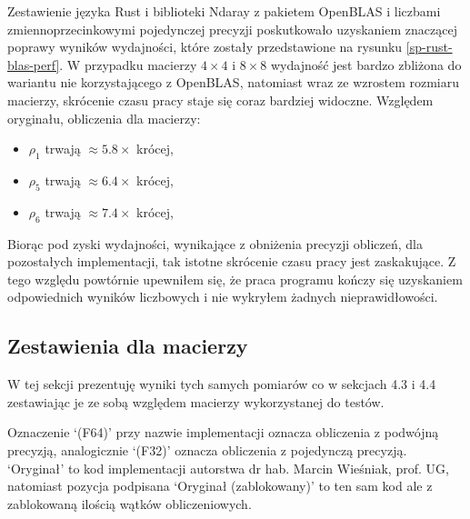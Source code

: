 \documentclass[11pt, a4paper]{article}
\begin{document}
\begin{sloppypar}
    Zestawienie języka Rust i biblioteki Ndaray z pakietem OpenBLAS i liczbami
    zmiennoprzecinkowymi pojedynczej precyzji poskutkowało uzyskaniem znaczącej poprawy
    wyników wydajności, które zostały przedstawione na rysunku \ref{sp-rust-blas-perf}.
    W przypadku macierzy $4\times4$ i $8\times8$ wydajność jest bardzo zbliżona do
    wariantu nie korzystającego z OpenBLAS, natomiast wraz ze wzrostem rozmiaru macierzy,
    skrócenie czasu pracy staje się coraz bardziej widoczne. Względem oryginału,
    obliczenia dla macierzy:
    \begin{itemize}
      \item $\rho_{1}$ trwają $\approx 5.8\times$ krócej,

      \item $\rho_{5}$ trwają $\approx 6.4\times$ krócej,

      \item $\rho_{6}$ trwają $\approx 7.4\times$ krócej,
    \end{itemize}
    Biorąc pod zyski wydajności, wynikające z obniżenia precyzji obliczeń, dla pozostałych
    implementacji, tak istotne skrócenie czasu pracy jest zaskakujące. Z tego względu powtórnie
    upewniłem się, że praca programu kończy się uzyskaniem odpowiednich wyników
    liczbowych i nie wykryłem żadnych nieprawidłowości.

    \FloatBarrier

    \subsection{Zestawienia dla macierzy}
    W tej sekcji prezentuję wyniki tych samych pomiarów co w sekcjach 4.3 i 4.4 zestawiając
    je ze sobą względem macierzy wykorzystanej do testów.

    Oznaczenie `(F64)' przy nazwie implementacji oznacza obliczenia z podwójną precyzją,
    analogicznie `(F32)' oznacza obliczenia z pojedynczą precyzją. `Oryginał' to kod implementacji
    autorstwa dr hab. Marcin Wieśniak, prof. UG, natomiast pozycja podpisana `Oryginał (zablokowany)'
    to ten sam kod ale z zablokowaną ilością wątków obliczeniowych.


\end{sloppypar}
\end{document}
